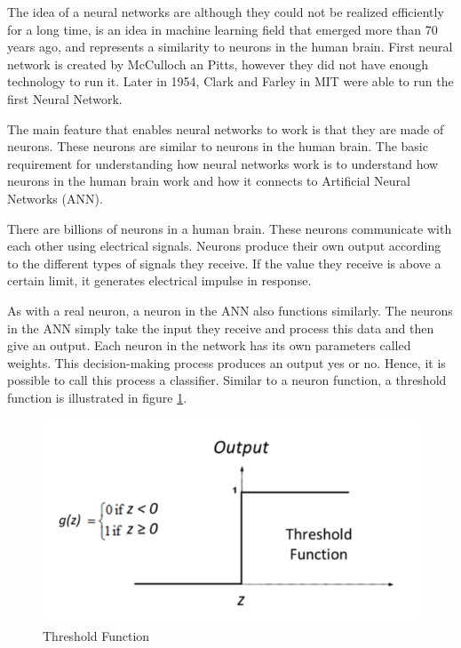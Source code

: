 The idea of a neural networks are although they could not be realized efficiently for a long time, is an idea in machine learning field that emerged more than 70 years ago, and represents a similarity to neurons in the human brain. First neural network is created by McCulloch an Pitts, however they did not have enough technology to run it. Later in 1954, Clark and Farley in MIT were able to run the first Neural Network.

The main feature that enables neural networks to work is that they are made of neurons. These neurons are similar to neurons in the human brain. The basic requirement for understanding how neural networks work is to understand how neurons in the human brain work and how it connects to Artificial Neural Networks (ANN).

There are billions of neurons in a human brain. These neurons communicate with each other using electrical signals. Neurons produce their own output according to the different types of signals they receive. If the value they receive is above a certain limit, it generates electrical impulse in response.

As with a real neuron, a neuron in the ANN also functions similarly. The neurons in the ANN simply take the input they receive and process this data and then give an output. Each neuron in the network has its own parameters called weights. This decision-making process produces an output yes or no. Hence, it is possible to call this process a classifier. Similar to a neuron function, a threshold function is illustrated in figure \ref{fig:threshold}.

\begin{figure}[h]
    \centering
    \includegraphics[scale=0.7]{figures/chapter3/threshol.png}
    \caption{Threshold Function}
    \label{fig:threshold}
\end{figure}

